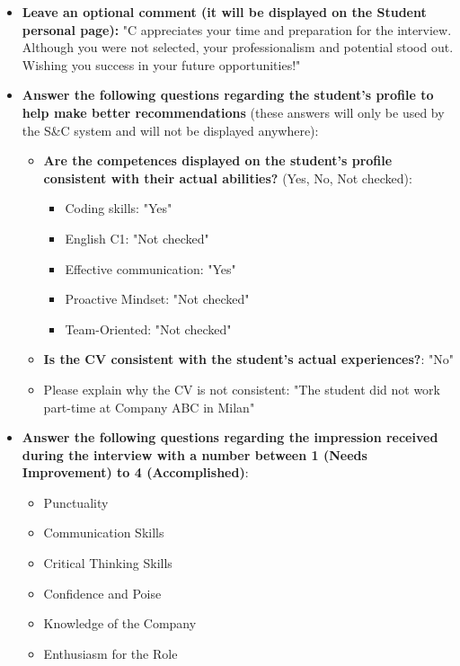 \begin{itemize}
    \item \textbf{Leave an optional comment (it will be displayed on the Student personal page):} "C appreciates your time and preparation for the interview. Although you were not selected, your professionalism and potential stood out. Wishing you success in your future opportunities!"
    \item \textbf{Answer the following questions regarding the student's profile to help make better recommendations} (these answers will only be used by the S\&C system and will not be displayed anywhere):
    \begin{itemize}
        \item \textbf{Are the competences displayed on the student's profile consistent with their actual abilities?} (Yes, No, Not checked):
        \begin{itemize}
            \item Coding skills: "Yes"
            \item English C1: "Not checked"
            \item Effective communication: "Yes"
            \item Proactive Mindset: "Not checked"
            \item Team-Oriented: "Not checked"
        \end{itemize}
        \item \textbf{Is the CV consistent with the student's actual experiences?}: "No"
        \item Please explain why the CV is not consistent: "The student did not work part-time at Company ABC in Milan"
    \end{itemize}
    \item\textbf{Answer the following questions regarding the impression received during the interview with a number between 1 (Needs Improvement) to 4 (Accomplished)}:
    \begin{itemize}
        \item Punctuality 
        \item Communication Skills
        \item Critical Thinking Skills
        \item Confidence and Poise
        \item Knowledge of the Company
        \item Enthusiasm for the Role
    \end{itemize}
\end{itemize}


